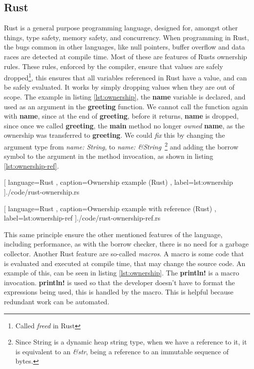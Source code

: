\subsection{Rust}

Rust is a general purpose programming language, designed for, amongst other
things, type safety, memory safety, and concurrency. When programming in Rust,
the bugs common in other languages, like null pointers, buffer overflow and data
races are detected at compile time. Most of these are features of Rusts
ownership rules. These rules, enforced by the compiler, ensure that values are
safely dropped\footnote{Called \textit{freed} in Rust}, this ensures that all
variables referenced in Rust have a value, and can be safely evaluated. It works
by simply dropping values when they are out of scope. The example in listing
\ref{lst:ownership}, the \textbf{name} variable is declared, and used as an
argument in the \textbf{greeting} function. We cannot call the function again
with \textbf{name}, since at the end of \textbf{greeting}, before it returns,
\textbf{name} is dropped, since once we called \textbf{greeting}, the
\textbf{main} method no longer \textit{owned} \textbf{name}, as the ownership
was transferred to \textbf{greeting}. We could \textit{fix} this by changing the
argument type from \textit{name: String}, to \textit{name: \&String}~\footnote{Since String is a dynamic heap string type, when we have a reference to it, it is equivalent to an \textit{\&str}, being a reference to an immutable sequence of bytes.}
and adding the borrow symbol to the argument in
the method invocation, as shown in listing \ref{lst:ownership-ref}.

\begin{center}
  
    [ language=Rust
    , caption={Ownership example (Rust)}
    , label=lst:ownership
    ]{./code/rust-ownership.rs}
\end{center}

\begin{center}
  
    [ language=Rust
    , caption={Ownership example with reference (Rust)}
    , label=lst:ownership-ref
    ]{./code/rust-ownership-ref.rs}
\end{center}

This same principle ensure the other mentioned features of the language,
including performance, as with the borrow checker, there is no need for a
garbage collector. Another Rust feature are so-called \textit{macros}. A macro
is some code that is evaluated and executed at compile time, that may change
the source code. An example of this, can be seen in listing \ref{lst:ownership}.
The \textbf{println!} is a macro invocation. \textbf{println!} is used so that
the developer doesn't have to format the expressions being used, this is handled
by the macro. This is helpful because redundant work can be automated.

